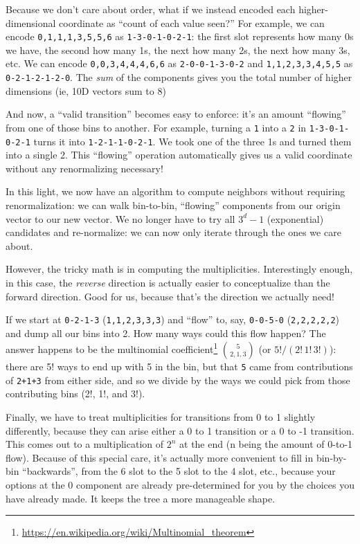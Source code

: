 \documentclass[]{article}
\renewcommand{\href}[2]{#2\footnote{\url{#1}}}
\begin{document}
Because we don't care about order, what if we instead encoded each
higher-dimensional coordinate as ``count of each value seen?'' For example, we
can encode \texttt{0,1,1,1,3,5,5,6} as \texttt{1-3-0-1-0-2-1}: the first slot
represents how many 0s we have, the second how many 1s, the next how many 2s,
the next how many 3s, etc. We can encode \texttt{0,0,3,4,4,4,6,6} as
\texttt{2-0-0-1-3-0-2} and \texttt{1,1,2,3,3,4,5,5} as \texttt{0-2-1-2-1-2-0}.
The \emph{sum} of the components gives you the total number of higher dimensions
(ie, 10D vectors sum to 8)

And now, a ``valid transition'' becomes easy to enforce: it's an amount
``flowing'' from one of those bins to another. For example, turning a \texttt{1}
into a \texttt{2} in \texttt{1-3-0-1-0-2-1} turns it into
\texttt{1-2-1-1-0-2-1}. We took one of the three 1s and turned them into a
single 2. This ``flowing'' operation automatically gives us a valid coordinate
without any renormalizing necessary!

In this light, we now have an algorithm to compute neighbors without requiring
renormalization: we can walk bin-to-bin, ``flowing'' components from our origin
vector to our new vector. We no longer have to try all \(3^d-1\) (exponential)
candidates and re-normalize: we can now only iterate through the ones we care
about.

However, the tricky math is in computing the multiplicities. Interestingly
enough, in this case, the \emph{reverse} direction is actually easier to
conceptualize than the forward direction. Good for us, because that's the
direction we actually need!

If we start at \texttt{0-2-1-3} (\texttt{1,1,2,3,3,3}) and ``flow'' to, say,
\texttt{0-0-5-0} (\texttt{2,2,2,2,2}) and dump all our bins into 2. How many
ways could this flow happen? The answer happens to be the
\href{https://en.wikipedia.org/wiki/Multinomial_theorem}{multinomial
coefficient} \(5 \choose {2,1,3}\) (or \(5! / (2!\,1!\,3!)\)): there are 5! ways
to end up with 5 in the bin, but that \texttt{5} came from contributions of
\texttt{2+1+3} from either side, and so we divide by the ways we could pick from
those contributing bins (2!, 1!, and 3!).

Finally, we have to treat multiplicities for transitions from 0 to 1 slightly
differently, because they can arise either a 0 to 1 transition or a 0 to -1
transition. This comes out to a multiplication of \(2^n\) at the end (n being
the amount of 0-to-1 flow). Because of this special care, it's actually more
convenient to fill in bin-by-bin ``backwards'', from the 6 slot to the 5 slot to
the 4 slot, etc., because your options at the 0 component are already
pre-determined for you by the choices you have already made. It keeps the tree a
more manageable shape.
\end{document}
